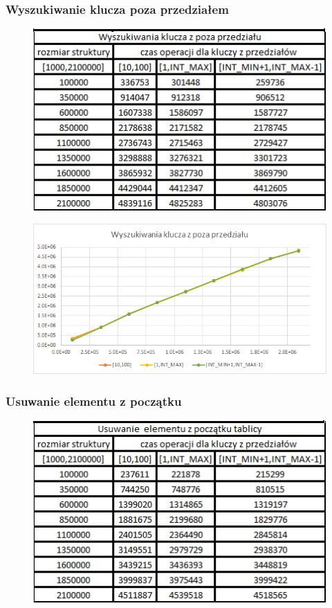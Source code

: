 \documentclass{article}
\begin{document}
\newpage

\subsubsection*{Wyszukiwanie klucza poza przedziałem}

\begin{figure}[h!]
    \centering
    \includegraphics{images/Wyszukiwanie.png}
\end{figure}

\begin{figure}[h!]
    \centering
    \includegraphics[width=11.3cm]{images/wyszukiwanie_tab.png}
\end{figure}

\newpage

\subsubsection*{Usuwanie elementu z początku}

\begin{figure}[h!]
    \centering
    \includegraphics{images/usuwanie_poczatek.png}
\end{figure}
\end{document}
